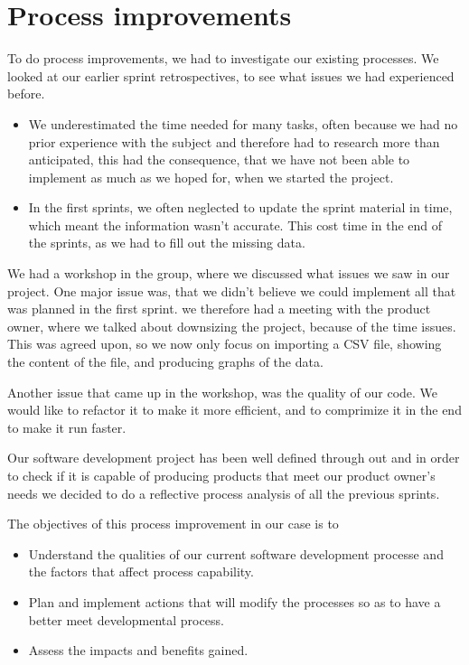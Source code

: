 \section{Process improvements} %
\label{sec:improvements}
To do process improvements, we had to investigate our existing processes. We looked at our earlier sprint retrospectives, to see what issues we had experienced before.
\begin{itemize}
	\item We underestimated the time needed for many tasks, often because we had no prior experience with the subject and therefore had to research more than anticipated, this had the consequence, that we have not been able to implement as much as we hoped for, when we started the project.
	\item In the first sprints, we often neglected to update the sprint material in time, which meant the information wasn't accurate. This cost time in the end of the sprints, as we had to fill out the missing data.
\end{itemize}

We had a workshop in the group, where we discussed what issues we saw in our project. One major issue was, that we didn't believe we could implement all that was planned in the first sprint.
we therefore had a meeting with the product owner, where we talked about downsizing the project, because of the time issues. This was agreed upon, so we now only focus on importing a CSV file, showing the content of the file, and producing graphs of the data.

Another issue that came up in the workshop, was the quality of our code. We would like to refactor it to make it more efficient, and to comprimize it in the end to make it run faster.

Our software development project has been well defined through out and in order to check if
it is capable of producing products that meet our product owner's needs we decided to do a
reflective process analysis of all the previous sprints.

The objectives of this process improvement in our case is to

\begin{itemize}
	\item Understand the qualities of our current software development processe and the factors that affect process capability.
	\item Plan and  implement actions that will modify the processes so as to have a better meet developmental process.
	\item Assess the impacts and benefits gained.
\end{itemize}

